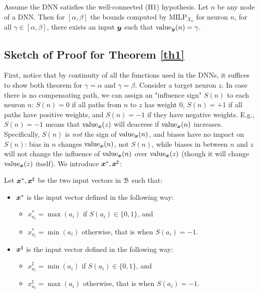 \begin{theorem}
	\label{th2} 
	Assume the DNN satisfies the well-connected (H1) hypothesis.
	Let $n$ be any node of a DNN. Then for $[\alpha,\beta]$ the bounds computed by MILP$_{X_n}$ for neuron $n$, for all $\gamma \in [\alpha,\beta]$, there exists an input $\boldsymbol{y}$ such that ${\textrm{value}}_{\boldsymbol{y}}(n)=\gamma$.
\end{theorem}


\subsection{Sketch of Proof for Theorem \ref{th1}}
\label{sec.proofs}

First, notice that by continuity of all the functions used in the DNNs, it suffices to show both theorem for $\gamma=\alpha$ and $\gamma=\beta$.
Consider a target neuron $z$.
In case there is no compensating path, we can assign an "influence sign" $S(n)$ to each neuron $n$: $S(n)=0$ if all paths from $n$ to $z$ has weight 0, $S(n)=+1$ if all paths have positive weights, and $S(n)=-1$ if they have negative weights. E.g., $S(n)=-1$ means that ${\textrm{value}}_{\boldsymbol{x}}(z)$ will deacrese if ${\textrm{value}}_{\boldsymbol{x}}(n)$ increases. 
Specifically, $S(n)$ is {\em not} the sign of ${\textrm{value}}_{\boldsymbol{x}}(n)$, and biases have no impact on  $S(n)$: bias in $n$ changes ${\textrm{value}}_{\boldsymbol{x}}(n)$, not $S(n)$, while biases in between $n$ and $z$ will not change the influence of ${\textrm{value}}_{\boldsymbol{x}}(n)$ over ${\textrm{value}}_{\boldsymbol{x}}(z)$ (though it will change ${\textrm{value}}_{\boldsymbol{x}}(z)$ itself). We introduce $\boldsymbol{x}^{*}, \boldsymbol{x}^{\sharp}$:

\begin{definition}
Let $\boldsymbol{x}^{*}, \boldsymbol{x}^{\sharp}$ be the two input vectors in $\cal B$ such that: 
	\begin{itemize}
		\item $\boldsymbol{x}^{*}$ is the input vector defined in the following way:
		\begin {itemize}
		 \item $x^*_{a_i}=\max(a_i)$ if $S(a_i)\in \{0,1\}$, and
          \item $x^*_{a_i}=\min(a_i)$ otherwise, that is when $S(a_i)=-1$.
	\end{itemize}
		
		\item $\boldsymbol{x}^{\sharp}$ is the input vector defined in the following way:
		\begin{itemize}
			\item $x^{\sharp}_{a_i}=\min(a_i)$ if $S(a_i)\in \{0,1\}$, and
			\item $x^{\sharp}_{a_i}=\max(a_i)$ otherwise, that is when $S(a_i)=-1$.
		\end{itemize}
	\end{itemize}
\end{definition}


